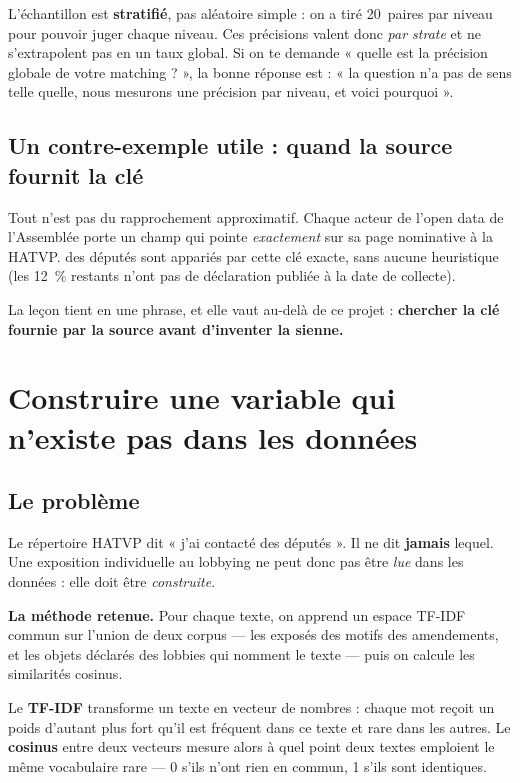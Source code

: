 \documentclass[11pt,a4paper]{article}
\begin{document}
\begin{encadre}
L'échantillon est \textbf{stratifié}, pas aléatoire simple : on a tiré 20~paires par
niveau pour pouvoir juger chaque niveau. Ces précisions valent donc \emph{par strate} et ne
s'extrapolent pas en un taux global. Si on te demande « quelle est la précision globale de
votre matching ? », la bonne réponse est : « la question n'a pas de sens telle quelle, nous
mesurons une précision par niveau, et voici pourquoi ».
\end{encadre}

\subsection{Un contre-exemple utile : quand la source fournit la clé}

Tout n'est pas du rapprochement approximatif. Chaque acteur de l'open data de l'Assemblée
porte un champ  qui pointe \emph{exactement} sur sa page nominative à
la HATVP.  des députés sont appariés par cette clé exacte, sans aucune
heuristique (les 12~\% restants n'ont pas de déclaration publiée à la date de collecte).

La leçon tient en une phrase, et elle vaut au-delà de ce projet :
\textbf{chercher la clé fournie par la source avant d'inventer la sienne.}

\newpage
\section{Construire une variable qui n'existe pas dans les données}

\subsection{Le problème}

Le répertoire HATVP dit « j'ai contacté des députés ». Il ne dit \textbf{jamais} lequel.
Une exposition individuelle au lobbying ne peut donc pas être \emph{lue} dans les données :
elle doit être \emph{construite}.

\textbf{La méthode retenue.} Pour chaque texte, on apprend un espace TF-IDF commun sur
l'union de deux corpus --- les exposés des motifs des amendements, et les objets déclarés
des lobbies qui nomment le texte --- puis on calcule les similarités cosinus.

\begin{jargon}
Le \textbf{TF-IDF} transforme un texte en vecteur de nombres : chaque mot reçoit un poids
d'autant plus fort qu'il est fréquent dans ce texte et rare dans les autres. Le
\textbf{cosinus} entre deux vecteurs mesure alors à quel point deux textes emploient le
même vocabulaire rare --- 0 s'ils n'ont rien en commun, 1 s'ils sont identiques.
\end{jargon}
\end{document}
